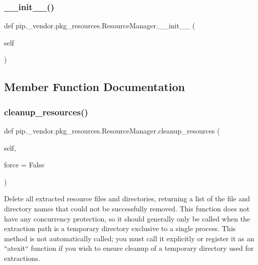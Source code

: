 \subsubsection{\texorpdfstring{\+\_\+\+\_\+init\+\_\+\+\_\+()}{\_\_init\_\_()}}
{\footnotesize\ttfamily def pip.\+\_\+vendor.\+pkg\+\_\+resources.\+Resource\+Manager.\+\_\+\+\_\+init\+\_\+\+\_\+ (\begin{DoxyParamCaption}\item[{}]{self }\end{DoxyParamCaption})}



\subsection{Member Function Documentation}
\mbox{\label{classpip_1_1__vendor_1_1pkg__resources_1_1ResourceManager_aa33a85f98817f7e76b8f3f4cfed9a8e1}} 
\subsubsection{\texorpdfstring{cleanup\+\_\+resources()}{cleanup\_resources()}}
{\footnotesize\ttfamily def pip.\+\_\+vendor.\+pkg\+\_\+resources.\+Resource\+Manager.\+cleanup\+\_\+resources (\begin{DoxyParamCaption}\item[{}]{self,  }\item[{}]{force = {\ttfamily False} }\end{DoxyParamCaption})}

\begin{DoxyVerb}Delete all extracted resource files and directories, returning a list
of the file and directory names that could not be successfully removed.
This function does not have any concurrency protection, so it should
generally only be called when the extraction path is a temporary
directory exclusive to a single process.  This method is not
automatically called; you must call it explicitly or register it as an
``atexit`` function if you wish to ensure cleanup of a temporary
directory used for extractions.
\end{DoxyVerb}
 \mbox{\label{classpip_1_1__vendor_1_1pkg__resources_1_1ResourceManager_ac2eee188c89f4f2f3607dd89cd37b66e}} 
